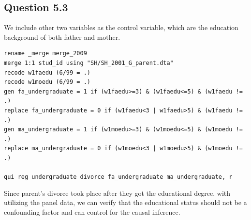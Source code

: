 \documentclass[11pt, letterpaper]{article}
\begin{document}
\subsection*{Question 5.3}

We include other two variables as the control variable, which are the education background of both father and mother.

\begin{lstlisting}
rename _merge merge_2009
merge 1:1 stud_id using "SH/SH_2001_G_parent.dta"
recode w1faedu (6/99 = .)
recode w1moedu (6/99 = .)
gen fa_undergraduate = 1 if (w1faedu>=3) & (w1faedu<=5) & (w1faedu != .)
replace fa_undergraduate = 0 if (w1faedu<3 | w1faedu>5) & (w1faedu != .)
gen ma_undergraduate = 1 if (w1moedu>=3) & (w1moedu<=5) & (w1moedu != .)
replace ma_undergraduate = 0 if (w1moedu<3 | w1moedu>5) & (w1moedu != .)

qui reg undergraduate divorce fa_undergraduate ma_undergraduate, r
\end{lstlisting}

Since parent's divorce took place after they got the educational degree, with utilizing the panel data, we can verify that the educational status should not be a confounding factor and can control for the causal inference.
\end{document}
